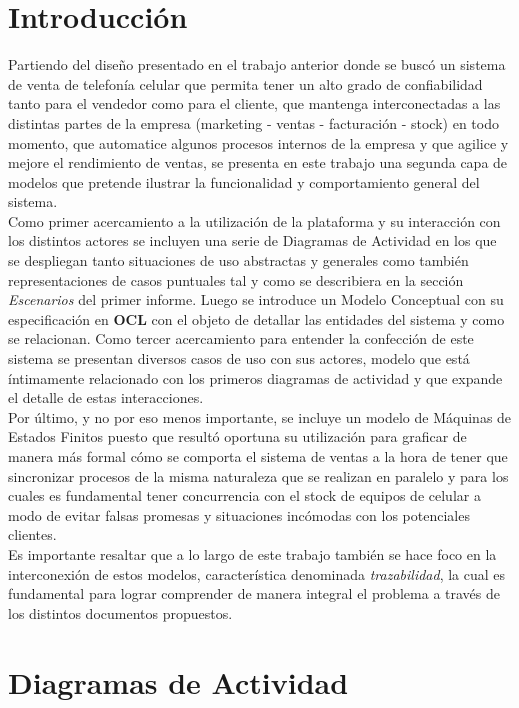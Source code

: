 \section{Introducción}
Partiendo del diseño presentado en el trabajo anterior donde se buscó un sistema de venta de telefonía celular que permita tener un alto grado de confiabilidad tanto para el vendedor como para el cliente, que mantenga interconectadas a las distintas partes de la empresa (marketing - ventas - facturación - stock) en todo momento, que automatice algunos procesos internos de la empresa y que agilice y mejore el rendimiento de ventas, se presenta en este trabajo una segunda capa de modelos que pretende ilustrar la funcionalidad y comportamiento general del sistema.\\
\indent Como primer acercamiento a la utilización de la plataforma y su interacción con los distintos actores se incluyen una serie de Diagramas de Actividad en los que se despliegan tanto situaciones de uso abstractas y generales como también representaciones de casos puntuales tal y como se describiera en la sección \textsl{Escenarios} del primer informe. Luego se introduce un Modelo Conceptual con su especificación en \textbf{OCL} con el objeto de detallar las entidades del sistema y como se relacionan. Como tercer acercamiento para entender la confección de este sistema se presentan diversos casos de uso con sus actores, modelo que está íntimamente relacionado con los primeros diagramas de actividad y que expande el detalle de estas interacciones.\\
\indent Por último, y no por eso menos importante, se incluye un modelo de Máquinas de Estados Finitos puesto que resultó oportuna su utilización para graficar de manera más formal cómo se comporta el sistema de ventas a la hora de tener que sincronizar procesos de la misma naturaleza que se realizan en paralelo y para los cuales es fundamental tener concurrencia con el stock de equipos de celular a modo de evitar falsas promesas y situaciones incómodas con los potenciales clientes.\\
\indent Es importante resaltar que a lo largo de este trabajo también se hace foco en la interconexión de estos modelos, característica denominada \textsl{trazabilidad}, la cual es fundamental para lograr comprender de manera integral el problema a través de los distintos documentos propuestos.\\

\section{Diagramas de Actividad}

